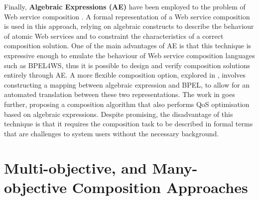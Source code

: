 Finally, \textbf{Algebraic Expressions (AE)} have been employed to the problem of Web service composition \cite{ferrara2004web, kattepur2013qos}. A formal representation of a Web service composition is used in this approach, relying on algebraic constructs to describe the behaviour of atomic Web services and to constraint the characteristics of a correct composition solution. One of the main advantages of AE is that this technique is expressive enough to emulate the behaviour of Web service composition languages such as BPEL4WS, thus it is possible to design and verify composition solutions entirely through AE. A more flexible composition option, explored in \cite{ferrara2004web}, involves constructing a mapping between algebraic expression and BPEL, to allow for an automated translation between these two representations. The work in \cite{kattepur2013qos} goes further, proposing a composition algorithm that also performs QoS optimisation based on algebraic expressions. Despite promising, the disadvantage of this technique is that it requires the composition task to be described in formal terms that are challenges to system users without the necessary background.

\section{Multi-objective, and Many-objective Composition Approaches}\label{MultiObjective}



